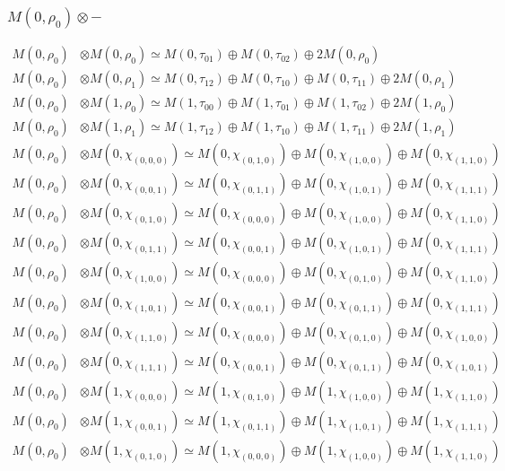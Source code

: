 \subsubsection{$ M(0,\rho_{0})\otimes -$}
\begin{align*}
M(0,\rho_{0}) &\otimes M(0,\rho_{0}) \simeq M(0,\tau_{01}) \oplus M(0,\tau_{02}) \oplus 2 M(0,\rho_{0}) \\
M(0,\rho_{0}) &\otimes M(0,\rho_{1}) \simeq M(0,\tau_{12}) \oplus M(0,\tau_{10}) \oplus M(0,\tau_{11}) \oplus 2 M(0,\rho_{1}) \\
M(0,\rho_{0}) &\otimes M(1,\rho_{0}) \simeq M(1,\tau_{00}) \oplus M(1,\tau_{01}) \oplus M(1,\tau_{02}) \oplus 2 M(1,\rho_{0}) \\
M(0,\rho_{0}) &\otimes M(1,\rho_{1}) \simeq M(1,\tau_{12}) \oplus M(1,\tau_{10}) \oplus M(1,\tau_{11}) \oplus 2 M(1,\rho_{1}) \\
M(0,\rho_{0}) &\otimes M(0,\chi_{(0,0,0)}) \simeq M(0,\chi_{(0,1,0)}) \oplus M(0,\chi_{(1,0,0)}) \oplus M(0,\chi_{(1,1,0)}) \\
M(0,\rho_{0}) &\otimes M(0,\chi_{(0,0,1)}) \simeq M(0,\chi_{(0,1,1)}) \oplus M(0,\chi_{(1,0,1)}) \oplus M(0,\chi_{(1,1,1)}) \\
M(0,\rho_{0}) &\otimes M(0,\chi_{(0,1,0)}) \simeq M(0,\chi_{(0,0,0)}) \oplus M(0,\chi_{(1,0,0)}) \oplus M(0,\chi_{(1,1,0)}) \\
M(0,\rho_{0}) &\otimes M(0,\chi_{(0,1,1)}) \simeq M(0,\chi_{(0,0,1)}) \oplus M(0,\chi_{(1,0,1)}) \oplus M(0,\chi_{(1,1,1)}) \\
M(0,\rho_{0}) &\otimes M(0,\chi_{(1,0,0)}) \simeq M(0,\chi_{(0,0,0)}) \oplus M(0,\chi_{(0,1,0)}) \oplus M(0,\chi_{(1,1,0)}) \\
M(0,\rho_{0}) &\otimes M(0,\chi_{(1,0,1)}) \simeq M(0,\chi_{(0,0,1)}) \oplus M(0,\chi_{(0,1,1)}) \oplus M(0,\chi_{(1,1,1)}) \\
M(0,\rho_{0}) &\otimes M(0,\chi_{(1,1,0)}) \simeq M(0,\chi_{(0,0,0)}) \oplus M(0,\chi_{(0,1,0)}) \oplus M(0,\chi_{(1,0,0)}) \\
M(0,\rho_{0}) &\otimes M(0,\chi_{(1,1,1)}) \simeq M(0,\chi_{(0,0,1)}) \oplus M(0,\chi_{(0,1,1)}) \oplus M(0,\chi_{(1,0,1)}) \\
M(0,\rho_{0}) &\otimes M(1,\chi_{(0,0,0)}) \simeq M(1,\chi_{(0,1,0)}) \oplus M(1,\chi_{(1,0,0)}) \oplus M(1,\chi_{(1,1,0)}) \\
M(0,\rho_{0}) &\otimes M(1,\chi_{(0,0,1)}) \simeq M(1,\chi_{(0,1,1)}) \oplus M(1,\chi_{(1,0,1)}) \oplus M(1,\chi_{(1,1,1)}) \\
M(0,\rho_{0}) &\otimes M(1,\chi_{(0,1,0)}) \simeq M(1,\chi_{(0,0,0)}) \oplus M(1,\chi_{(1,0,0)}) \oplus M(1,\chi_{(1,1,0)}) \\

\end{align*}
